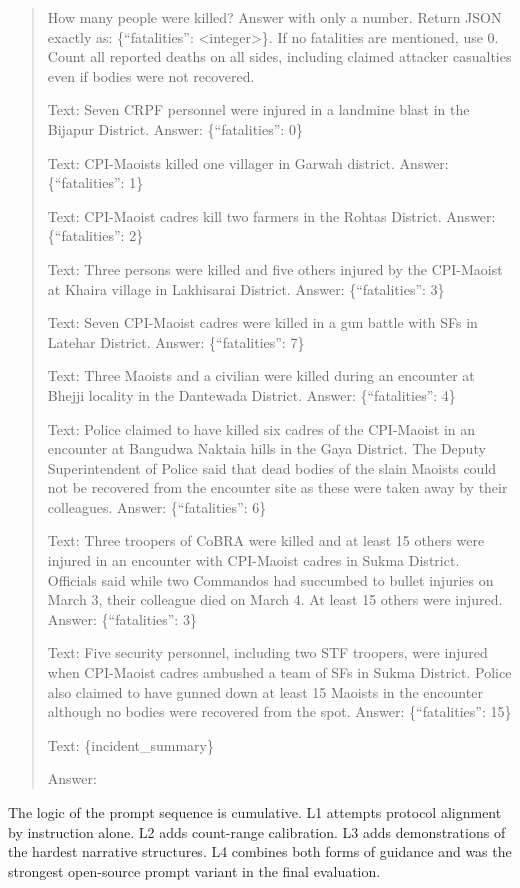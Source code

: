\documentclass[
  11pt,
]{article}
\begin{document}
\begin{quote}
How many people were killed? Answer with only a number. Return JSON
exactly as: \{``fatalities'': \textless integer\textgreater\}. If no
fatalities are mentioned, use 0. Count all reported deaths on all sides,
including claimed attacker casualties even if bodies were not recovered.

Text: Seven CRPF personnel were injured in a landmine blast in the
Bijapur District. Answer: \{``fatalities'': 0\}

Text: CPI-Maoists killed one villager in Garwah district. Answer:
\{``fatalities'': 1\}

Text: CPI-Maoist cadres kill two farmers in the Rohtas District. Answer:
\{``fatalities'': 2\}

Text: Three persons were killed and five others injured by the
CPI-Maoist at Khaira village in Lakhisarai District. Answer:
\{``fatalities'': 3\}

Text: Seven CPI-Maoist cadres were killed in a gun battle with SFs in
Latehar District. Answer: \{``fatalities'': 7\}

Text: Three Maoists and a civilian were killed during an encounter at
Bhejji locality in the Dantewada District. Answer: \{``fatalities'': 4\}

Text: Police claimed to have killed six cadres of the CPI-Maoist in an
encounter at Bangudwa Naktaia hills in the Gaya District. The Deputy
Superintendent of Police said that dead bodies of the slain Maoists
could not be recovered from the encounter site as these were taken away
by their colleagues. Answer: \{``fatalities'': 6\}

Text: Three troopers of CoBRA were killed and at least 15 others were
injured in an encounter with CPI-Maoist cadres in Sukma District.
Officials said while two Commandos had succumbed to bullet injuries on
March 3, their colleague died on March 4. At least 15 others were
injured. Answer: \{``fatalities'': 3\}

Text: Five security personnel, including two STF troopers, were injured
when CPI-Maoist cadres ambushed a team of SFs in Sukma District. Police
also claimed to have gunned down at least 15 Maoists in the encounter
although no bodies were recovered from the spot. Answer:
\{``fatalities'': 15\}

Text: \{incident\_summary\}

Answer:
\end{quote}

The logic of the prompt sequence is cumulative. L1 attempts protocol
alignment by instruction alone. L2 adds count-range calibration. L3 adds
demonstrations of the hardest narrative structures. L4 combines both
forms of guidance and was the strongest open-source prompt variant in
the final evaluation.
\end{document}
